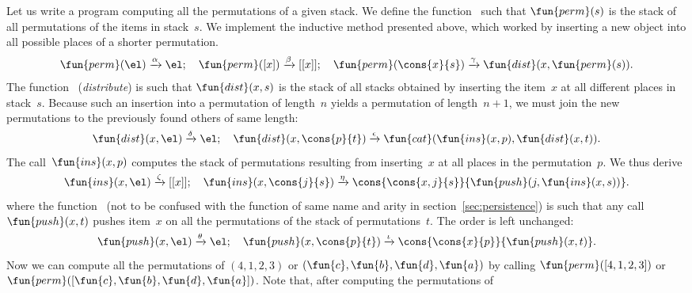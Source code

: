 Let us write a program computing all the permutations of a given
stack. We define the function~
such that \(\fun{perm}(s)\) is the stack of all permutations of the
items in stack~\(s\). We implement the inductive method presented
above, which worked by inserting a new object into all possible places
of a shorter permutation.
\begin{equation*}
\fun{perm}(\el)         \xrightarrow{\smash{\alpha}} \el;\quad
\fun{perm}([x])         \xrightarrow{\smash{\beta}} [[x]];\quad
\fun{perm}(\cons{x}{s}) \xrightarrow{\gamma}
                          \fun{dist}(x,\fun{perm}(s)).
\end{equation*}
The function~ (\emph{distribute})
is such that \(\fun{dist}(x,s)\) is the stack of all stacks obtained
by inserting the item~\(x\) at all different places in
stack~\(s\). Because such an insertion into a permutation of
length~\(n\) yields a permutation of length~\(n+1\), we must join the
new permutations to the previously found others of same length:
\begin{equation*}
\fun{dist}(x,\el)         \xrightarrow{\smash{\delta}} \el;\quad
\fun{dist}(x,\cons{p}{t}) \xrightarrow{\smash{\epsilon}}
                            \fun{cat}(\fun{ins}(x,p),\fun{dist}(x,t)).
\end{equation*}
The call~\(\fun{ins}(x,p)\) computes the stack
of permutations resulting from inserting~\(x\) at all places in the
permutation~\(p\). We thus derive
\begin{equation*}
\fun{ins}(x,\el) \xrightarrow{\smash{\zeta}} [[x]];\quad
\fun{ins}(x,\cons{j}{s}) \xrightarrow{\smash{\eta}}
 \cons{\cons{x,j}{s}}{\fun{push}(j,\fun{ins}(x,s))}.
\end{equation*}
where the function~ (not to be
confused with the function of same name and arity in
section~\ref{sec:persistence}) is such that any
call~\(\fun{push}(x,t)\) pushes item~\(x\) on all the permutations of
the stack of permutations~\(t\). The order is left unchanged:
\begin{equation*}
\fun{push}(x,\el) \xrightarrow{\smash{\theta}} \el;\quad
\fun{push}(x,\cons{p}{t}) \xrightarrow{\smash{\iota}}
 \cons{\cons{x}{p}}{\fun{push}(x,t)}.
\end{equation*}
Now we can compute all the permutations of \((4,1,2,3)\) or
\((\fun{c}, \fun{b}, \fun{d}, \fun{a})\) by calling
\(\fun{perm}([4,1,2,3])\) or \(\fun{perm}([\fun{c}, \fun{b}, \fun{d},
  \fun{a}])\). Note that, after computing the permutations of
